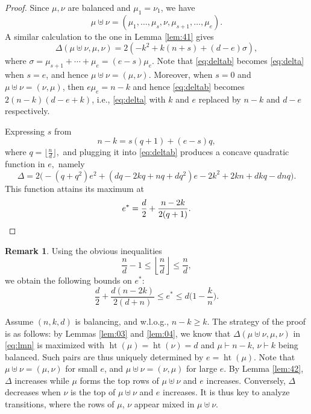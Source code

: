 \documentclass[12pt,dvipsnames,accepted=2016-08-18,a4paper,onecolumn]{quantumarticle}
\DeclareMathOperator{\het}{ht}
\newcommand{\floor}[1]{\left\lfloor #1 \right\rfloor}
\numberwithin{equation}{section}
\theoremstyle{definition}
\newtheorem{remark}[theorem]{Remark}
\begin{document}
\begin{proof}
Since $\mu,\nu$ are balanced and $\mu_1=\nu_1$, we have
$$\mu\uplus\nu=(\mu_1,\ldots,\mu_s,\nu,\mu_{s+1},\ldots,\mu_e).$$
    A similar calculation to the one in Lemma \ref{lem:41} gives
\begin{equation}\label{eq:deltab}
    \Delta(\mu\uplus\nu,\mu,\nu) = 
2 (-k^2 + k (n + s) + (d - e) \sigma),
\end{equation}
where $\sigma=\mu_{s+1}+\cdots+\mu_e=(e-s)\mu_e$. Note that \eqref{eq:deltab} becomes \eqref{eq:delta} when $s=e$, and hence $\mu\uplus\nu = (\mu, \nu).$
Moreover, when $s=0$ and $\mu\uplus\nu = (\nu,\mu)$, then $e\mu_e = n-k$ and hence \eqref{eq:deltab} becomes $2(n-k) (d - e + k)$, i.e., \eqref{eq:delta} with $k$ and $e$ replaced by $n-k$ and $d-e$ respectively.

Expressing $s$ from
$$
n-k = s (q+1) + (e-s)q,
$$
where $q = \lfloor \frac{n}{d}\rfloor,$ and plugging it into \eqref{eq:deltab} produces a concave quadratic function in $e,$ namely
\begin{equation}\label{eq:deltas}
\Delta=2\big(-(q+q^2)e^2 + (d q-2 k q+ n q + d q^2 )e
 -2 k^2 + 2 k n   + d k q  - d n q\big).
\end{equation}
This function attains its maximum at
\begin{equation}\label{eq:defestar}
    e^* = \frac{d}{2} + \frac{n-2k}{2(q+1)}. \qedhere
\end{equation} 
\end{proof}

\begin{remark}\label{rem:boundestar}
Using the obvious inequalities 
\[
    \frac nd-1\leq\floor{\frac nd}\leq \frac nd   , 
\]
we obtain the following bounds on $e^*$:
\[
     \frac{d}{2} 
     +\frac{d (n-2 k)}{2 (d+n)}
     \leq e^*\leq d \Big(1-\frac kn\Big) .
\]
\end{remark}

Assume $(n,k,d)$ is balancing, and w.l.o.g., $n-k\geq k$. 
The strategy of the proof is as follows: 
by Lemmas \ref{lem:03} and \ref{lem:04}, we know that $\Delta(\mu\uplus\nu,\mu,\nu)$ in 
\eqref{eq:lmn} is maximized with $\het(\mu)=\het(\nu)=d$ and
$\mu\vdash n-k$, $\nu\vdash k$ being balanced. 
Such pairs are thus uniquely determined by $e=\het(\mu)$. 
Note that $\mu\uplus\nu=(\mu,\nu)$ for small $e$, and $\mu\uplus\nu=(\nu,\mu)$ for large $e$.
By Lemma \ref{lem:42}, $\Delta$ increases while $\mu$ forms the top rows of $\mu\uplus\nu$ and $e$ increases. Conversely, $\Delta$ decreases when $\nu$ is the top of $\mu\uplus\nu$ and $e$ increases.
It is thus key to analyze transitions, where the rows of $\mu$, $\nu$ appear mixed in $\mu\uplus\nu$.
\end{document}
